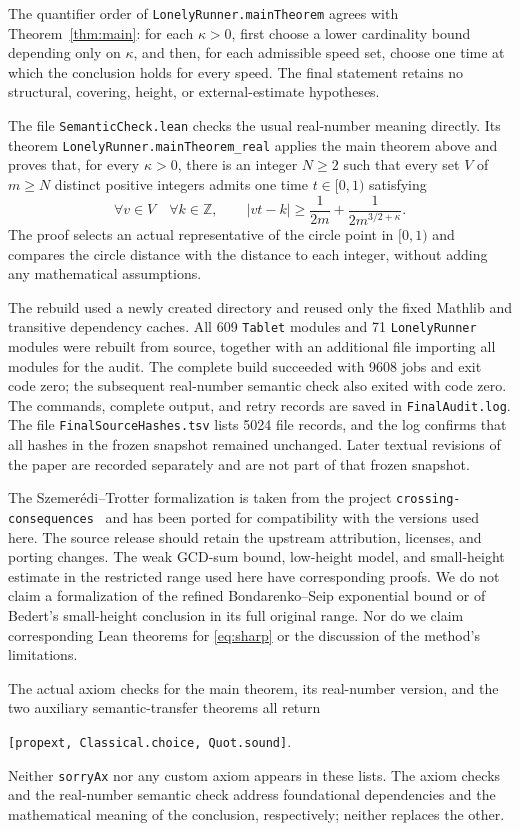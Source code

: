 \documentclass[12pt,leqno]{article}
\numberwithin{equation}{section}
\theoremstyle{remark}
\begin{document}
The quantifier order of \texttt{LonelyRunner.mainTheorem} agrees with
Theorem~\ref{thm:main}: for each $\kappa>0$, first choose a lower cardinality bound depending only on
$\kappa$, and then, for each admissible speed set, choose one time
at which the conclusion holds for every speed. The final statement retains no structural, covering,
height, or external-estimate hypotheses.

The file \texttt{SemanticCheck.lean} checks the usual real-number meaning directly. Its theorem
\texttt{LonelyRunner.mainTheorem\_real}
applies the main theorem above and proves that, for every $\kappa>0$, there is an integer
$N\ge2$ such that every set $V$ of $m\ge N$ distinct positive integers
admits one time $t\in[0,1)$ satisfying
\[
\forall v\in V\quad\forall k\in\mathbb Z,\qquad
|vt-k|\ge
\frac1{2m}+\frac1{2m^{3/2+\kappa}}.
\]
The proof selects an actual representative of the circle point in $[0,1)$ and compares the circle
distance with the distance to each integer, without adding any mathematical assumptions.

The rebuild used a newly created directory and reused only the fixed Mathlib and transitive dependency
caches. All 609 \texttt{Tablet} modules and
71 \texttt{LonelyRunner} modules were rebuilt from source,
together with an additional file importing all modules for the audit.
The complete build succeeded with 9608 jobs and exit code zero;
the subsequent real-number semantic check also exited with code zero.
The commands, complete output, and retry records are saved in
\texttt{FinalAudit.log}.
The file \texttt{FinalSourceHashes.tsv} lists 5024 file records,
and the log confirms that all hashes in the frozen snapshot remained unchanged.
Later textual revisions of the paper are recorded separately and are not part of that frozen snapshot.

The Szemer\'edi--Trotter formalization is taken from the project
\texttt{crossing-\allowbreak consequences}~\cite{STLean} and has been ported for compatibility with the versions used here.
The source release should retain the upstream attribution, licenses, and porting changes.
The weak GCD-sum bound, low-height model, and small-height estimate in the restricted range used here
have corresponding proofs. We do not claim a formalization of the refined
Bondarenko--Seip exponential bound or of Bedert's small-height conclusion in its full original range.
Nor do we claim corresponding Lean theorems for \eqref{eq:sharp} or
the discussion of the method's limitations.

The actual axiom checks for the main theorem, its real-number version, and the two auxiliary semantic-transfer theorems
all return
\begin{center}
\small
\texttt{[propext, Classical.choice, Quot.sound]}.
\end{center}
Neither \texttt{sorryAx} nor any custom axiom appears in these lists.
The axiom checks and the real-number semantic check address foundational dependencies and the mathematical meaning
of the conclusion, respectively; neither replaces the other.
\end{document}
